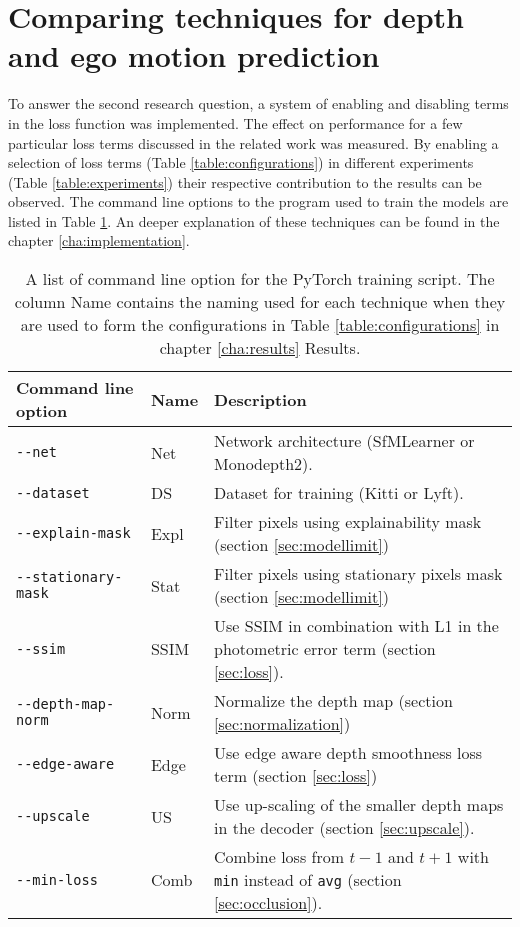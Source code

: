 
\section{Comparing techniques for depth and ego motion prediction}

To answer the second research question, a system of enabling and disabling terms in the loss function was implemented. The effect on performance for a few particular loss terms discussed in the related work was measured. By enabling a selection of loss terms (Table \ref{table:configurations}) in different experiments (Table \ref{table:experiments})  their respective contribution to the results can be observed. The command line options to the program used to train the models are listed in Table \ref{table:cli}. An deeper explanation of these techniques can be found in the chapter \ref{cha:implementation}.

\begin{table}[H]
	\centering
	\begin{tabular}{ |l|l|p{65mm}| }
		\hline
		Command line option & Name & Description \\
		\hline
		\texttt{-{}-net} & Net & Network architecture (SfMLearner or Monodepth2). \\
		\hline
		\texttt{-{}-dataset} & DS & Dataset for training (Kitti or Lyft). \\
		\hline
		\texttt{-{}-explain-mask} & Expl & Filter pixels using explainability mask (section \ref{sec:modellimit}) \\
		\hline
		\texttt{-{}-stationary-mask} & Stat & Filter pixels using stationary pixels mask (section \ref{sec:modellimit}) \\
		\hline
		\texttt{-{}-ssim} & SSIM & Use SSIM in combination with L1 in the photometric error term (section \ref{sec:loss}). \\
		\hline
		\texttt{-{}-depth-map-norm} & Norm & Normalize the depth map (section \ref{sec:normalization}) \\
		\hline
		\texttt{-{}-edge-aware} & Edge & Use edge aware depth smoothness loss term (section \ref{sec:loss}) \\
		\hline
		\texttt{-{}-upscale} & US & Use up-scaling of the smaller depth maps in the decoder (section \ref{sec:upscale}). \\
		\hline
		\texttt{-{}-min-loss} & Comb & Combine loss from $t-1$ and $t+1$ with \texttt{min} instead of \texttt{avg} (section \ref{sec:occlusion}). \\
		\hline
	\end{tabular}
	\caption{A list of command line option for the PyTorch training script. The column Name contains the naming used for each technique when they are used to form the configurations in Table \ref{table:configurations} in chapter \ref{cha:results} Results.}
	\label{table:cli}
\end{table}